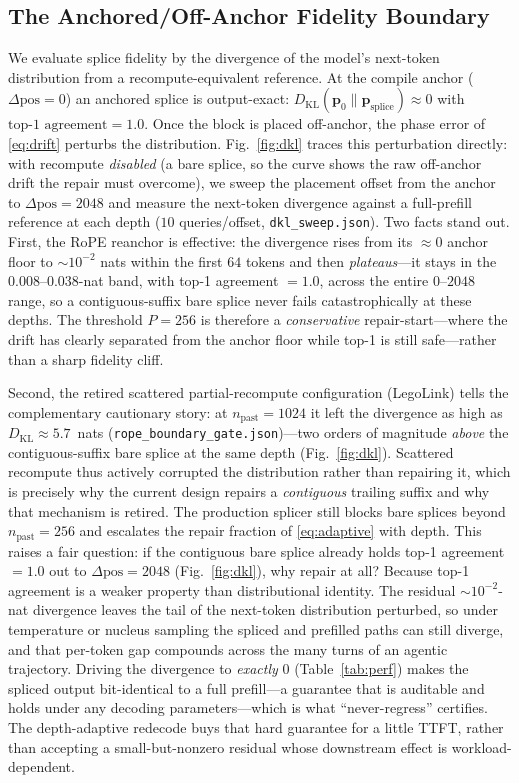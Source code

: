 \documentclass[10pt,conference]{IEEEtran}
\newcommand{\code}[1]{\texttt{\small #1}}
\begin{document}
\subsection{The Anchored/Off-Anchor Fidelity Boundary}
We evaluate splice fidelity by the divergence of the model's next-token distribution from a
recompute-equivalent reference. At the compile anchor ($\Delta\mathrm{pos}=0$) an anchored
splice is output-exact: $D_{\mathrm{KL}}(\mathbf{p}_0 \parallel \mathbf{p}_{\mathrm{splice}}) \approx 0$ with $\text{top-1 agreement} = 1.0$. Once the
block is placed off-anchor, the phase error of \eqref{eq:drift} perturbs the distribution.
Fig.~\ref{fig:dkl} traces this perturbation directly: with recompute \emph{disabled} (a bare splice,
so the curve shows the raw off-anchor drift the repair must overcome), we sweep the placement offset
from the anchor to $\Delta\mathrm{pos}=2048$ and measure the next-token divergence against a
full-prefill reference at each depth ($10$ queries/offset, \code{dkl\_sweep.json}). Two facts stand
out. First, the RoPE reanchor is effective: the divergence rises from its ${\approx}0$ anchor floor to
${\sim}10^{-2}$ nats within the first $64$ tokens and then \emph{plateaus}---it stays in the
$0.008$--$0.038$-nat band, with top-1 agreement $=1.0$, across the entire $0$--$2048$ range, so a
contiguous-suffix bare splice never fails catastrophically at these depths. The threshold $P=256$ is
therefore a \emph{conservative} repair-start---where the drift has clearly separated from the anchor
floor while top-1 is still safe---rather than a sharp fidelity cliff.

Second, the retired scattered partial-recompute configuration (LegoLink) tells the complementary
cautionary story: at $n_{\mathrm{past}}=1024$ it left the divergence as high as
$D_{\mathrm{KL}}\approx 5.7$~nats (\code{rope\_boundary\_gate.json})---two orders of magnitude
\emph{above} the contiguous-suffix bare splice at the same depth (Fig.~\ref{fig:dkl}). Scattered
recompute thus actively corrupted the distribution rather than repairing it, which is precisely why
the current design repairs a \emph{contiguous} trailing suffix and why that mechanism is retired.
The production splicer still blocks bare splices beyond $n_{\mathrm{past}}=256$ and escalates the
repair fraction of \eqref{eq:adaptive} with depth. This raises a fair question: if the contiguous
bare splice already holds top-1 agreement $=1.0$ out to $\Delta\mathrm{pos}=2048$
(Fig.~\ref{fig:dkl}), why repair at all? Because top-1 agreement is a weaker property than
distributional identity. The residual ${\sim}10^{-2}$-nat divergence leaves the tail of the
next-token distribution perturbed, so under temperature or nucleus sampling the spliced and
prefilled paths can still diverge, and that per-token gap compounds across the many turns of an
agentic trajectory. Driving the divergence to \emph{exactly} $0$ (Table~\ref{tab:perf}) makes the
spliced output bit-identical to a full prefill---a guarantee that is auditable and holds under any
decoding parameters---which is what ``never-regress'' certifies. The depth-adaptive redecode buys
that hard guarantee for a little TTFT, rather than accepting a small-but-nonzero residual whose
downstream effect is workload-dependent.
\end{document}
